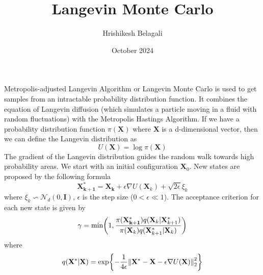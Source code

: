 \documentclass{article}
\title{Langevin Monte Carlo}
\author{Hrishikesh Belagali}
\date{October 2024}
\begin{document}
 
\maketitle
Metropolis-adjusted Langevin Algorithm or Langevin Monte Carlo is used to get samples from an intractable probability distribution function. 
It combines the equation of Langevin diffusion (which simulates a particle moving in a fluid with random fluctuations) with the Metropolis Hastings Algorithm. 
If we have a probability distribution function $\pi(\mathbf X)$ where $\mathbf X$ is a d-dimensional vector, then we can define the Langevin distribution as 
$$U(\mathbf X) = \log \pi(\mathbf X)$$ The gradient of the Langevin distribution guides the random walk towards high probability areas. We start with an initial configuration $\mathbf X_0$. New states are proposed by the following formula 
$$\mathbf{X^*_{k+1}} = \mathbf{X_k} + \epsilon \nabla U(\mathbf X_k) + \sqrt{2\epsilon}\xi_k$$ where $\xi_k \backsim \mathcal N_d(0, \mathbf I)$, $\epsilon$ is the step size ($0 < \epsilon \ll 1$). The acceptance criterion for each new state is given by 
$$\gamma = \text{min} \pqty{1, \frac{\pi(\mathbf{X^*_{k+1}})q(\mathbf X_k | \mathbf X^*_{k+1})}{\pi(\mathbf X_k)q(\mathbf X^*_{k+1} | \mathbf X_k)}}$$
where $$q(\mathbf X^* | \mathbf X) = \exp{-\frac{1}{4\epsilon}\norm{\mathbf X^* - \mathbf X - \epsilon \nabla U(\mathbf X)}_2^2}$$ 
\end{document}
